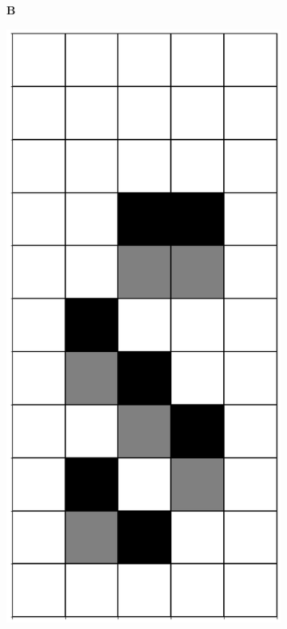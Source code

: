 \documentclass[12pt]{article}
\numberwithin{figure}{section} %
\begin{document}
\begin{figure}[H]
     	\begin{subfigure}[t]{0.03\textwidth}
    		\textbf{B}
  	\end{subfigure}
   	\begin{subfigure}{0.3\textwidth}
    		\centering
     		\includegraphics[angle=270,width=\linewidth]{Section4/4.0}

\end{subfigure}
\end{figure}
\end{document}
